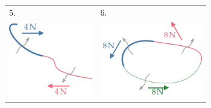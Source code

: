 \documentclass[a4paper,12pt,%
onecolumn,oneside,%
british%
]{memoir}
\renewcommand*{\|}[1][]{\nonscript\:#1\vert\nonscript\:\mathopen{}}
\begin{document}
\begin{tabularx}{\linewidth}[h]{XX}
\\[15ex]
5.&6.
\\
 \includegraphics[align=c, height=9em,width=0.4\linewidth,keepaspectratio]{images/sumN2.jpg}
&  \includegraphics[align=c, height=9em,width=0.4\linewidth,keepaspectratio]{images/sumN3.jpg}
\end{tabularx}


\section{}
\label{sec:integrated_flux}
\end{document}
